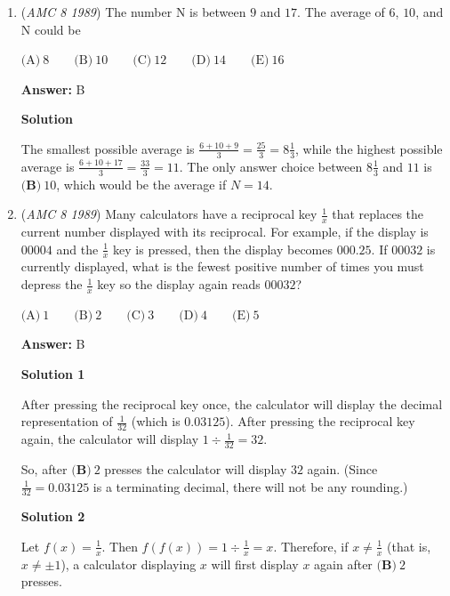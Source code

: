 \begin{enumerate}
 


	\item (\textit{AMC 8 1989}) The number $\text{N}$ is between $9$ and $17$.  The average of $6$, $10$, and $\text{N}$ could be


 $\text{(A)}\ 8 \qquad \text{(B)}\ 10 \qquad \text{(C)}\ 12 \qquad \text{(D)}\ 14 \qquad \text{(E)}\ 16$

 \textbf{Answer: }B



\textbf{Solution}

The smallest possible average is $\frac{6 + 10 + 9}{3} = \frac{25}{3} = 8\frac{1}{3}$, while the highest possible average is $\frac{6+10+17}{3} = \frac{33}{3} = 11$.  The only answer choice between $8\frac{1}{3}$ and $11$ is $\boxed{\textbf{(B)}\ 10}$, which would be the average if $N = 14$.

 


	\item (\textit{AMC 8 1989}) Many calculators have a reciprocal key $\boxed{\frac{1}{x}}$ that replaces the current number displayed with its reciprocal.  For example, if the display is $\boxed{00004}$ and the $\boxed{\frac{1}{x}}$ key is pressed, then the display becomes $\boxed{000.25}$.  If $\boxed{00032}$ is currently displayed, what is the fewest positive number of times you must depress the $\boxed{\frac{1}{x}}$ key so the display again reads $\boxed{00032}$?


 $\text{(A)}\ 1 \qquad \text{(B)}\ 2 \qquad \text{(C)}\ 3 \qquad \text{(D)}\ 4 \qquad \text{(E)}\ 5$

 \textbf{Answer: }B



\textbf{Solution 1}

After pressing the reciprocal key once, the calculator will display the decimal representation of $\frac{1}{32}$ (which is $0.03125$).  After pressing the reciprocal key again, the calculator will display $1 \div \frac{1}{32} = 32$.  

 So, after $\boxed{\textbf{(B)}\ 2}$ presses the calculator will display $32$ again.  (Since $\frac{1}{32} = 0.03125$ is a terminating decimal, there will not be any rounding.)

 



\textbf{Solution 2}

Let $f(x) = \frac{1}{x}$.  Then $f(f(x)) = 1 \div \frac{1}{x} = x$.  Therefore, if $x \neq \frac{1}{x}$ (that is, $x \neq \pm 1$), a calculator displaying $x$ will first display $x$ again after $\boxed{\textbf{(B)}\ 2}$ presses.


\end{enumerate}
